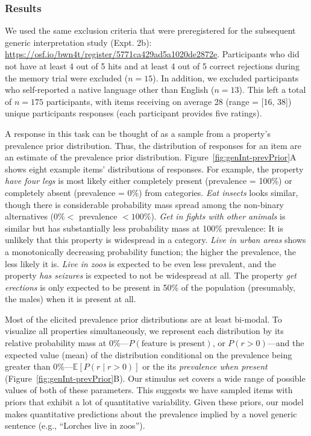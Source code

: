 \documentclass[floatsintext,doc]{apa6}
\begin{document}
\hypertarget{results}{%
\subsubsection{Results}\label{results}}

We used the same exclusion criteria that were preregistered for the subsequent generic interpretation study (Expt. 2b): \url{https://osf.io/bwn4t/register/5771ca429ad5a1020de2872e}.
Participants who did not have at least 4 out of 5 hits and at least 4 out of 5 correct rejections during the memory trial were excluded (\(n = 15\)).
In addition, we excluded participants who self-reported a native language other than English (\(n = 13\)).
This left a total of \(n = 175\) participants, with items receiving on average 28 (range = {[}16, 38{]}) unique participants responses (each participant provides five ratings).

A response in this task can be thought of as a sample from a property's prevalence prior distribution.
Thus, the distribution of responses for an item are an estimate of the prevalence prior distribution.
Figure~\ref{fig:genInt-prevPrior}A shows eight example items' distributions of responses.
For example, the property \emph{have four legs} is most likely either completely present (prevalence = 100\%) or completely absent (prevalence = 0\%) from categories.
\emph{Eat insects} looks similar, though there is considerable probability mass spread among the non-binary alternatives (\(0\% <\) prevalence \(< 100\%\)).
\emph{Get in fights with other animals} is similar but has substantially less probability mass at 100\% prevalence: It is unlikely that this property is widespread in a category.
\emph{Live in urban areas} shows a monotonically decreasing probability function; the higher the prevalence, the less likely it is.
\emph{Live in zoos} is expected to be even less prevalent, and the property \emph{has seizures} is expected to not be widespread at all.
The property \emph{get erections} is only expected to be present in 50\% of the population (presumably, the males) when it is present at all.

Most of the elicited prevalence prior distributions are at least bi-modal.
To visualize all properties simultaneously, we represent each distribution by its relative probability mass at 0\%---\(P(\text{feature is present})\), or \(P(r > 0)\)---and the expected value (mean) of the distribution conditional on the prevalence being greater than 0\%---\(\mathbb{E}[P(r \mid r>0)]\) or the its \emph{prevalence when present} (Figure~\ref{fig:genInt-prevPrior}B).
Our stimulus set covers a wide range of possible values of both of these parameters.
This suggests we have sampled items with priors that exhibit a lot of quantitative variability.
Given these priors, our model makes quantitative predictions about the prevalence implied by a novel generic sentence (e.g., \enquote{Lorches live in zoos}).
\end{document}
